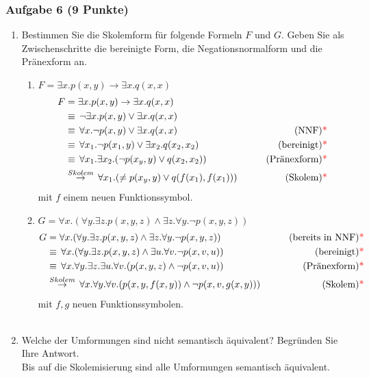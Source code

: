 \subsubsection*{Aufgabe 6 (9 Punkte)}
\begin{enumerate}
\item Bestimmen Sie die Skolemform für folgende Formeln $F$ und $G$.
Geben Sie als Zwischenschritte die bereinigte Form, die Negationsnormalform und die Pränexform an.
\begin{enumerate}[label=\roman*)]
\item $F = \exists x.p(x,y) \to \exists x.q(x,x)$ \\
\LOES 
\begin{align*}
F &= \exists x.p(x,y) \to \exists x.q(x,x) \\
&\equiv\, \neg \exists x.p(x,y) \lor \exists x.q(x,x) \\
&\equiv\, \forall x.\neg p(x,y) \lor \exists x.q(x,x) \qquad &\text{(NNF){\textcolor{red}{* }}} \\
&\equiv\, \forall x_1.\neg p(x_1,y) \lor \exists x_2.q(x_2,x_2) \qquad &\text{(bereinigt){\textcolor{red}{* }}} \\
&\equiv\, \forall x_1.\exists x_2.(\neg p(x_y,y) \lor q(x_2,x_2)) \qquad &\text{(Pränexform){\textcolor{red}{* }}} \\
&\stackrel{Skolem}{\rightarrow}\, \forall x_1.(\neq p(x_y, y) \lor q(f(x_1), f(x_1))) \qquad &\text{(Skolem){\textcolor{red}{* }}} 
\end{align*}
mit $f$ einem neuen Funktionssymbol. \\
\item $G = \forall x.(\forall y.\exists z.p(x,y,z) \land \exists z.\forall y.\neg p(x,y,z))$ \\
\LOES 
\begin{align*}
G &= \forall x.(\forall y.\exists z.p(x,y,z) \land \exists z.\forall y.\neg p(x,y,z)) \qquad &\text{(bereits in NNF){\textcolor{red}{* }}} \\
&\equiv\, \forall x.(\forall y.\exists z.p(x,y,z) \land \exists u.\forall v.\neg p(x,v,u)) \qquad &\text{(bereinigt){\textcolor{red}{* }}} \\
&\equiv\, \forall x.\forall y.\exists z.\exists u.\forall v.(p(x,y,z) \land \neg p(x,v,u)) \qquad &\text{(Pränexform){\textcolor{red}{* }}} \\
&\stackrel{Skolem}{\rightarrow}\, \forall x.\forall y.\forall v.(p(x,y,f(x,y)) \land \neg p(x,v,g(x,y))) \qquad &\text{(Skolem){\textcolor{red}{* }}} 
\end{align*}
mit $f,g$ neuen Funktionssymbolen.\\\\
\end{enumerate}
\item Welche der Umformungen sind nicht semantisch äquivalent? Begründen Sie Ihre Antwort. \\
\LOES Bis auf die Skolemisierung sind alle Umformungen semantisch äquivalent.\POINT 
\end{enumerate}

